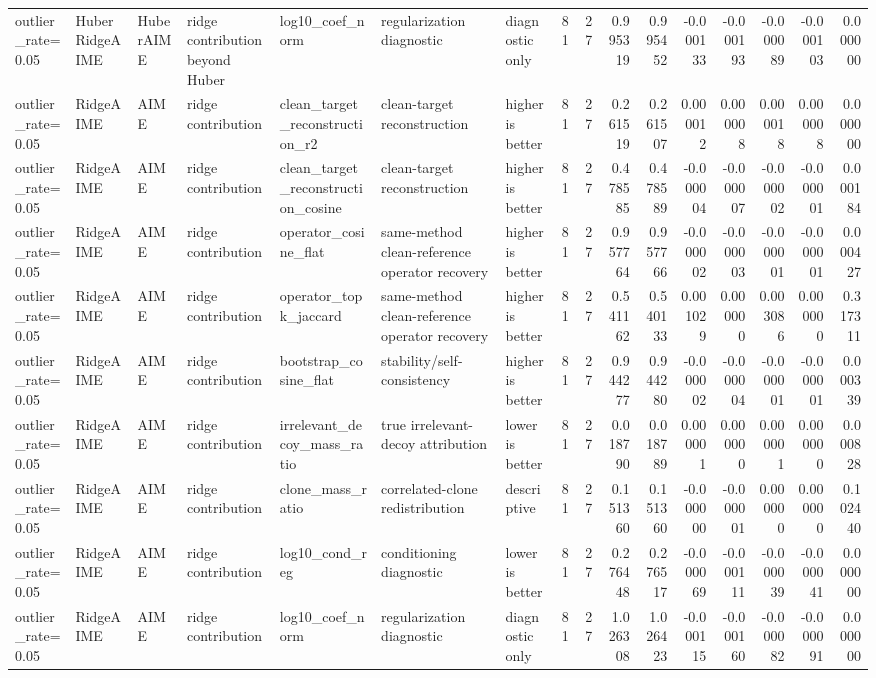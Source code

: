 \begin{table}[t]
\begin{tabular}{lllllllrrrrrrrrr}
outlier_rate=0.05 & HuberRidgeAIME & HuberAIME & ridge contribution beyond Huber & log10_coef_norm & regularization diagnostic & diagnostic only & 81 & 27 & 0.995319 & 0.995452 & -0.000133 & -0.000193 & -0.000089 & -0.000103 & 0.000000 \\
outlier_rate=0.05 & RidgeAIME & AIME & ridge contribution & clean_target_reconstruction_r2 & clean-target reconstruction & higher is better & 81 & 27 & 0.261519 & 0.261507 & 0.000012 & 0.000008 & 0.000018 & 0.000008 & 0.000000 \\
outlier_rate=0.05 & RidgeAIME & AIME & ridge contribution & clean_target_reconstruction_cosine & clean-target reconstruction & higher is better & 81 & 27 & 0.478585 & 0.478589 & -0.000004 & -0.000007 & -0.000002 & -0.000001 & 0.000184 \\
outlier_rate=0.05 & RidgeAIME & AIME & ridge contribution & operator_cosine_flat & same-method clean-reference operator recovery & higher is better & 81 & 27 & 0.957764 & 0.957766 & -0.000002 & -0.000003 & -0.000001 & -0.000001 & 0.000427 \\
outlier_rate=0.05 & RidgeAIME & AIME & ridge contribution & operator_topk_jaccard & same-method clean-reference operator recovery & higher is better & 81 & 27 & 0.541162 & 0.540133 & 0.001029 & 0.000000 & 0.003086 & 0.000000 & 0.317311 \\
outlier_rate=0.05 & RidgeAIME & AIME & ridge contribution & bootstrap_cosine_flat & stability/self-consistency & higher is better & 81 & 27 & 0.944277 & 0.944280 & -0.000002 & -0.000004 & -0.000001 & -0.000001 & 0.000339 \\
outlier_rate=0.05 & RidgeAIME & AIME & ridge contribution & irrelevant_decoy_mass_ratio & true irrelevant-decoy attribution & lower is better & 81 & 27 & 0.018790 & 0.018789 & 0.000001 & 0.000000 & 0.000001 & 0.000000 & 0.000828 \\
outlier_rate=0.05 & RidgeAIME & AIME & ridge contribution & clone_mass_ratio & correlated-clone redistribution & descriptive & 81 & 27 & 0.151360 & 0.151360 & -0.000000 & -0.000001 & 0.000000 & 0.000000 & 0.102440 \\
outlier_rate=0.05 & RidgeAIME & AIME & ridge contribution & log10_cond_reg & conditioning diagnostic & lower is better & 81 & 27 & 0.276448 & 0.276517 & -0.000069 & -0.000111 & -0.000039 & -0.000041 & 0.000000 \\
outlier_rate=0.05 & RidgeAIME & AIME & ridge contribution & log10_coef_norm & regularization diagnostic & diagnostic only & 81 & 27 & 1.026308 & 1.026423 & -0.000115 & -0.000160 & -0.000082 & -0.000091 & 0.000000 \\

\end{tabular}
\end{table}
